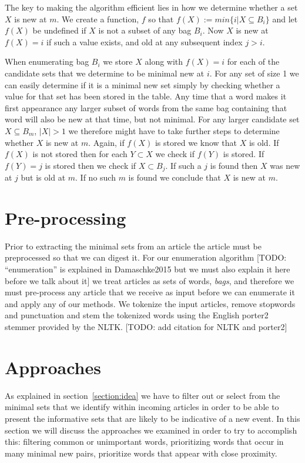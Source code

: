 The key to making the algorithm efficient lies in how we determine whether a set $X$ is new at $m$. We create a function, $f$ so that $f(X) := min\{i|X \subseteq B_{i}\}$ and let $f(X)$ be undefined if $X$ is not a subset of any bag $B_{i}$. Now $X$ is new at $f(X)=i$ if such a value exists, and old at any subsequent index $j>i$. 

When enumerating bag $B_{i}$ we store $X$ along with $f(X)=i$ for each of the candidate sets that we determine to be minimal new at $i$. For any set of size 1 we can easily determine if it is a minimal new set simply by checking whether a value for that set has been stored in the table.  Any time that a word makes it first appearance any larger subset of words from the same bag containing that word will also be new at that time, but not minimal. For any larger candidate set $X \subseteq B_{m}$, $|X|>1$ we therefore might have to take further steps to determine whether $X$ is new at $m$. Again, if $f(X)$ is stored we know that $X$ is old. If $f(X)$ is not stored then for each $Y \subset X$ we check if $f(Y)$ is stored. If $f(Y)=j$ is stored then we check if $X \subset B_{j}$. If such a $j$ is found then $X$ was new at $j$ but is old at $m$. If no such $m$ is found we conclude that $X$ is new at $m$.


\section{Pre-processing}
Prior to extracting the minimal sets from an article the article must be preprocessed so that we can digest it. For our enumeration algorithm [TODO: ``enumeration'' is explained in Damaschke2015 but we must also explain it here before we talk about it] we treat articles as sets of words, \emph{bags}, and therefore we must pre-process any article that we receive as input before we can enumerate it and apply any of our methods. We tokenize the input articles, remove stopwords and punctuation and stem the tokenized words using the English porter2 stemmer provided by the NLTK. [TODO: add citation for NLTK and porter2]

\section{Approaches}
As explained in section~\ref{section:idea} we have to filter out or select from the minimal sets that we identify within incoming articles in order to be able to present the informative sets that are likely to be indicative of a new event. In this section we will discuss the approaches we examined in order to try to accomplish this: filtering common or unimportant words, prioritizing words that occur in many minimal new pairs, prioritize words that appear with close proximity.

